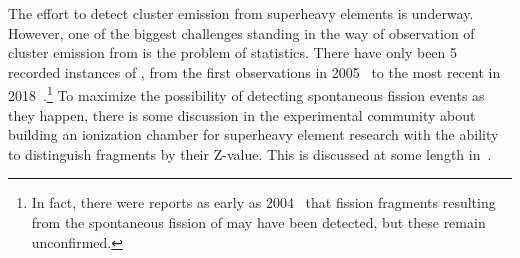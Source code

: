 The effort to detect cluster emission from superheavy elements is underway. However, one of the biggest challenges standing in the way of observation of cluster emission from {\Og} is the problem of statistics. There have only been 5 recorded instances of {\Og}, from the first observations in 2005~\cite{Oganessian2006} to the most recent in 2018~\cite{Brewer2018}.\footnote{In fact, there were reports as early as 2004~\cite{Oganessian2004} that fission fragments resulting from the spontaneous fission of {\Og} may have been detected, but these remain unconfirmed.} To maximize the possibility of detecting spontaneous fission events as they happen, there is some discussion in the experimental community about building an ionization chamber for superheavy element research with the ability to distinguish fragments by their Z-value. This is discussed at some length in~\cite{Brewer2018}.

%
